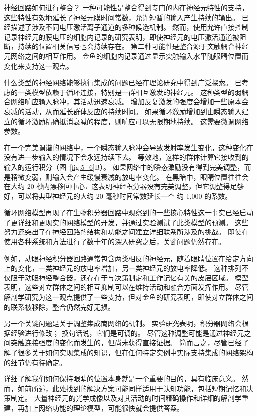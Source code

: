 神经回路如何进行整合？ 
一种可能性是整合得到专门的内在神经元特性的支持，这些特性有效地延长了神经元膜时间常数，允许短暂的输入产生持续的输出。
已经描述了涉及不同电压激活离子通道的多种候选机制。 
然而，使用允许直接控制记录神经元的膜电压的细胞内记录的研究表明，即使神经元的电压激活通道被阻断，持续的位置相关信号也会持续存在。 
第二种可能性是整合源于突触耦合神经元网络之间的相互作用。 
金鱼的细胞内记录通过显示突触输入水平随眼睛位置而变化来支持这一观点。


什么类型的神经网络能够执行集成的问题已经在理论研究中得到广泛探索。 
已考虑的一类模型依赖于循环连接，特别是一群相互激发的神经元。 
这种类型的弱耦合网络响应输入脉冲，其活动迅速衰减。 
增加反复激发的强度会增加一些原本会衰减的活动，从而延长群体反应的持续时间。
如果循环激励增加到由瞬态输入建立的循环激励精确抵消衰减的程度，则响应可以无限期地持续。 这需要微调网络参数。


在一个完美调谐的网络中，一个瞬态输入脉冲会导致发射率发生变化，这种变化在没有进一步输入的情况下会永远持续下去。 
等效地，这样的群体计算它接收到的输入的运行积分（图~\ref{fig:5_6}B）。 
如果网络中的瞬态激励没有得到完美调整，而是稍微变弱，则输入会产生缓慢衰减的放电率变化。 
在黑暗中，眼睛位置往往会在大约 20 秒内漂移回中心，这表明神经积分器没有完美调整，但它调整得足够好，可以将典型神经元的大约 20 毫秒时间常数延长一个 约 1,000 的系数。


循环网络模型再现了在生物积分器回路中观察到的一些核心特性这一事实已经启动了更详细和更现实的网络模型的开发，并通过实验测试了此类模型的预测。 
这些努力还突出了在神经回路的结构和功能之间建立详细联系所涉及的挑战。 
即使在使用各种系统和方法进行了数十年的深入研究之后，关键问题仍然存在。


例如，动眼神经积分器回路通常包含两类相反的神经元，随着眼睛位置在给定方向上的变化，一类神经元的放电率增加，另一类神经元的放电率降低。 
这种排列不仅限于动眼神经整合器，还存在于与决策制定和工作记忆有关的皮层区域。
模型表明，这些对立群体之间的相互抑制可以在维持活动和融合方面发挥作用。 
尽管解剖学研究为这一观点提供了一些支持，但对金鱼的研究表明，即使对立群体之间的联系被移除，整合仍然完好无损。


另一个关键问题是关于调整集成商网络的机制。 
实验研究表明，积分器网络会根据经验进行修改；
换句话说，它们是可调的。 
尽管这种调整可能是通过神经元之间突触连接强度的变化而发生的，但尚未获得直接证据。 
简而言之，尽管已经了解了很多关于如何实现集成的知识，但在任何特定实例中实际支持集成的网络架构的细节仍有待确定。


详细了解我们如何保持眼睛的位置本身就是一个重要的目的，具有临床意义。 
然而，如前所述，此处找到的解决方案可能同样适用于认知功能，包括短期记忆和决策制定。
大量神经元的光学成像以及对其活动的时间精确操作和详细的解剖学重建，再加上网络功能的理论模型，可能很快就会提供答案。



